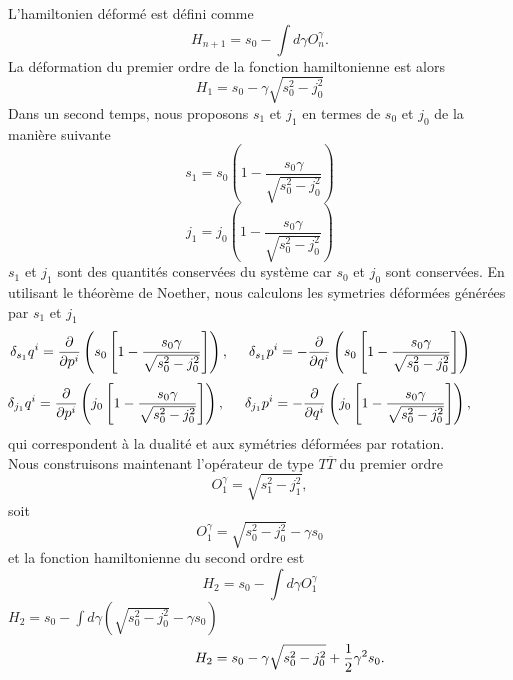 \documentclass[12pt,a4paper, openany]{report}
\begin{document}
	L'hamiltonien déformé est défini comme 
	\begin{equation}
		H_{n+1}=s_0-\int d{\gamma}O^{\gamma}_n .
	\end{equation}
	La déformation du premier ordre de la fonction hamiltonienne est alors 
	\begin{equation}
		H_1=s_0-\gamma\sqrt{s^2_0-j^2_0}
	\end{equation}
	Dans un second temps, nous proposons $s_1$ et $j_1$ en termes de $s_0$ et $j_0$ de la manière suivante 
	\begin{equation}
		s_1=s_0\left(1-\frac{s_0\gamma}{\sqrt{s^2_0-j^2_0}}\right)
	\end{equation}
	\begin{equation}
		j_1=j_0\left(1-\frac{s_0\gamma}{\sqrt{s^2_0-j^2_0}}\right)	
	\end{equation}
	$s_1$ et $j_1$ sont des quantités conservées du système car $s_0$ et $j_0$ sont conservées. En utilisant le théorème de Noether, nous calculons les symetries déformées générées par $s_1$ et $j_1$
	\begin{equation}
		\hspace{-1.cm} \delta_{s_1}q^i=\frac{\partial}{\partial p^i}\left(s_0\left[1-\frac{s_0\gamma}{\sqrt{s^2_0-j^2_0}}\right]\right), \hspace{0.5cm}\delta_{s_1}p^i=-\frac{\partial}{\partial q^i}\left(s_0\left[1-\frac{s_0\gamma}{\sqrt{s^2_0-j^2_0}}\right]\right)
	\end{equation}
	\begin{equation}
		\hspace{-1cm}\delta_{j_1}q^i=\frac{\partial}{\partial p^i}\left(j_0\left[1-\frac{s_0\gamma}{\sqrt{s^2_0-j^2_0}}\right]\right),\hspace{0.5cm}\delta_{j_1}p^i=-\frac{\partial}{\partial q^i}\left(j_0\left[1-\frac{s_0\gamma}{\sqrt{s^2_0-j^2_0}}\right]\right),
	\end{equation}
	qui correspondent à la dualité et aux symétries déformées par rotation.\\
	Nous construisons maintenant l'opérateur de type  $T{\overline{T}}$ du premier ordre 
	\begin{equation}
		O^{\gamma}_1=\sqrt{s^2_1-j^2_1} , 
	\end{equation}
	soit 
	\begin{equation}
		O^{\gamma}_1=\sqrt{s^2_0-j^2_0}-{\gamma}s_0
	\end{equation} 
	et la fonction hamiltonienne du second ordre est 
	\begin{equation}
		H_2=s_0-\int d{\gamma}	O^{\gamma}_1
	\end{equation}
	\hspace{5cm} $H_2= s_0-\int d{\gamma}\left(\sqrt{s^2_0-j^2_0}-{\gamma}s_0\right)$	\\
	\begin{equation}
		\hspace{1.5cm}	H_2=s_0-\gamma\sqrt{s^2_0-j^2_0}+\frac{1}{2}\gamma^{2}s_0 .
	\end{equation} 
	
\end{document}
